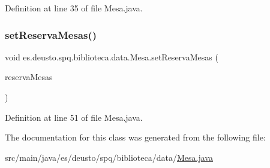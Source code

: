 Definition at line 35 of file Mesa.\+java.

\mbox{\label{classes_1_1deusto_1_1spq_1_1biblioteca_1_1data_1_1_mesa_af960339335802227aa788285130eb4c7}} 
\subsubsection{\texorpdfstring{set\+Reserva\+Mesas()}{setReservaMesas()}}
{\footnotesize\ttfamily void es.\+deusto.\+spq.\+biblioteca.\+data.\+Mesa.\+set\+Reserva\+Mesas (\begin{DoxyParamCaption}\item[{List$<$ \mbox{\hyperlink{classes_1_1deusto_1_1spq_1_1biblioteca_1_1data_1_1_reserva_mesa}{Reserva\+Mesa}} $>$}]{reserva\+Mesas }\end{DoxyParamCaption})}



Definition at line 51 of file Mesa.\+java.



The documentation for this class was generated from the following file\+:\begin{DoxyCompactItemize}
\item 
src/main/java/es/deusto/spq/biblioteca/data/\mbox{\hyperlink{_mesa_8java}{Mesa.\+java}}\end{DoxyCompactItemize}
